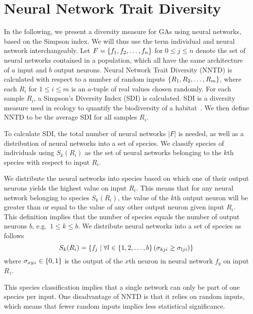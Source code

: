 \section{Neural Network Trait Diversity}
In the following, we present a diversity measure for GAs using neural networks, based on the Simpson index. We will thus use the term individual and neural network interchangeably. Let $F = \{ f_1, f_2, \dots, f_n \}$ for $0 \leq j \leq n$ denote the set of neural networks contained in a population, which all have the same architecture of $a$ input and $b$ output neurons. Neural Network Trait Diversity (NNTD) is calculated with respect to a number of random inputs $\{ R_1, R_2, \dots, R_m \}$, where each $R_i$ for $1 \leq i \leq m$ is an $a$-tuple of real values chosen randomly. For each sample $R_i$, a Simpson's Diversity Index (SDI) is calculated. SDI is a diversity measure used in ecology to quantify the biodiversity of a habitat~\cite{simpson1949measurement}. We then define NNTD to be the average SDI for all samples $R_i$.

To calculate SDI, the total number of neural networks $\lvert F \lvert$ is needed, as well as a distribution of neural networks into a set of species. We classify species of individuals using $S_k(R_i)$ as the set of neural networks belonging to the $k$th species with respect to input $R_i$.

We distribute the neural networks into species based on which one of their output neurons yields the highest value on input $R_i$. This means that for any neural network belonging to species $S_k(R_i)$, the value of the $k$th output neuron will be greater than or equal to the value of any other output neuron given input $R_i$.  This definition implies that the number of species equals the number of output neurons $b$, e.g.\ $1 \leq k \leq b$. We distribute neural networks into a set of species as follows
%
\begin{equation*}\label{eq:species}
  S_k(R_i) = \{ f_j \mid \forall l \in \{ 1, 2, \dots, b \} \left(\sigma_{kji} \geq \sigma_{lji}\right) \}
\end{equation*}
%
where $\sigma_{xyz} \in \{ 0, 1 \}$ is the output of the $x$th neuron in neural network $f_y$ on input $R_z$.

This species classification implies that a single network can only be part of one species per input. One disadvantage of NNTD is that it relies on random inputs, which means that fewer random inputs implies less statistical significance.
